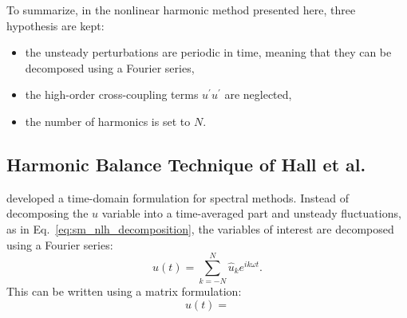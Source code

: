 To summarize, in the nonlinear harmonic method presented here,
three hypothesis are kept:
\begin{itemize}
	\item the unsteady perturbations are periodic in time, 
	meaning that they can be decomposed using a Fourier series,
	\item the high-order cross-coupling terms $u^\prime u^\prime$
	are neglected,
	\item the number of harmonics is set to $N$.
\end{itemize}



\subsection{Harmonic Balance Technique of Hall et al.} %
\label{sub:harmonic_balance_technique_of_hall}

\citet{Hall2002} developed a time-domain formulation for spectral
methods. Instead of decomposing the $u$ variable into a time-averaged
part and unsteady fluctuations, as in Eq.~\ref{eq:sm_nlh_decomposition},
the variables of interest are decomposed using a Fourier series:
\begin{equation}
	u (t) = \sum_{k=-N}^{N} \widehat{u}_k e^{i k \omega t}.
	\label{eq:sm_hbt_decomposition}
\end{equation}
This can be written using a matrix formulation:
\begin{equation}
	u (t) = 
\end{equation}




